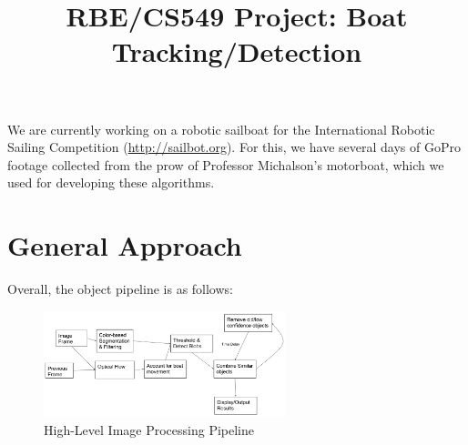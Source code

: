 \documentclass[conference]{IEEEtran}
\begin{document}
\title{RBE/CS549 Project: Boat Tracking/Detection}
\author{}
\maketitle

We are currently working on a robotic sailboat for the
International Robotic Sailing Competition (\url{http://sailbot.org}). For this,
we have several days of GoPro footage collected from the prow of Professor
Michalson's motorboat, which we used for developing these algorithms.

\section{General Approach}

Overall, the object pipeline is as follows:
\begin{figure}[H]
\includegraphics[width=7cm]{algorithm_flowchart}
\centering
\caption{High-Level Image Processing Pipeline}
\end{figure}
\end{document}
